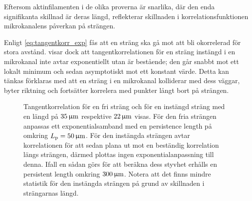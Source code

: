 Eftersom aktinfilamenten i de olika proverna är snarlika, där den enda signifikanta skillnad är deras längd, reflekterar skillnaden i korrelationsfunktionen mikrokanalens påverkan på strängen. %

Enligt \eqref{eq:tangentkorr_exp} fås att en sträng ska gå mot att bli okorrelerad för stora avstånd.  visar dock att tangentkorrelationen för en sträng instängd i en mikrokanal inte avtar exponentiellt utan är bestående; den går snabbt mot ett lokalt minimum och sedan asymptotiskt mot ett konstant värde. %
Detta kan tänkas förklaras med att en sträng i en mikrokanal kolliderar med dess väggar, byter riktning och fortsätter korrelera med punkter långt bort på strängen. 

\begin{figure}
    \centering
    
    \caption{Tangentkorrelation för en fri sträng och för en instängd sträng med en längd på $\unit[35]{\micro m}$ respektive $\unit[22]{\micro m}$ visas. För den fria strängen anpassas ett exponentialsamband med en persistence length på omkring $L_\text{p} = \unit[50]{\micro m}$. För den instängda strängen avtar korrelationen för att sedan plana ut mot en beständig korrelation längs strängen, därmed plottas ingen exponentialanpassning till denna. Ifall en sådan görs för att beräkna dess styvhet erhålls en persistent length omkring $\unit[300]{\micro m}$. Notera att det finns mindre statistik för den instängda strängen på grund av skillnaden i strängarnas längd.}
    \label{fig:tangentkorr}
\end{figure}

